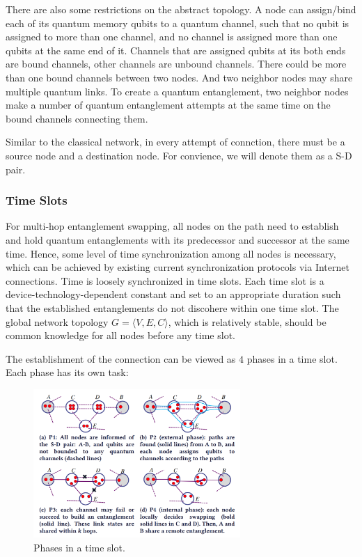 \documentclass[10pt]{article}
\begin{document}
There are also some restrictions on the abstract topology. A node can assign/bind each of its quantum memory qubits to a quantum channel, such that no qubit is assigned to more than one channel, and no channel is assigned more than one qubits at the same end of it. Channels that are assigned qubits at its both ends are bound channels, other channels are unbound channels. There could be more than one bound channels between two nodes. And two neighbor nodes may share multiple quantum links. To create a quantum entanglement, two neighbor nodes make a number of quantum entanglement attempts at the same time on the bound channels connecting them.



Similar to the classical network, in every attempt of connction, there must be a source node and a destination node. For convience, we will denote them as a S-D pair.

\subsubsection{Time Slots}

For multi-hop entanglement swapping, all nodes on the path need to establish and hold quantum entanglements with its predecessor and successor at the same time.  Hence, some level of time synchronization among all nodes is necessary, which can be achieved by existing current synchronization protocols via Internet connections. Time is loosely synchronized in time slots.
Each time slot is a device-technology-dependent constant and set to an appropriate duration such that the established entanglements do not discohere within one time slot. The global network topology $G = \langle V, E,C\rangle$, which is relatively stable, should be common knowledge for all nodes before any time slot.

The establishment of the connection can be viewed as $4$ phases in a time slot. Each phase has its own task:

\begin{figure}[htbp]
    \centering
    \includegraphics[width=0.7\textwidth]{figure/time_slot.jpg}
    \caption{Phases in a time slot.}
    \label{time slot}
\end{figure}
\end{document}
